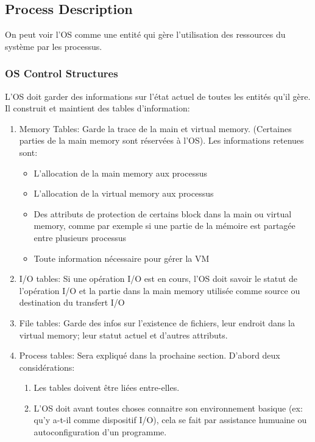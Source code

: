\subsection{Process Description}
On peut voir l'OS comme une entité qui gère l'utilisation des ressources du système par les processus.

\subsubsection{OS Control Structures}
L'OS doit garder des informations sur l'état actuel de toutes les entités qu'il gère.
Il construit et maintient des tables d'information:
\begin{enumerate}
  \item
    Memory Tables: Garde la trace de la main et virtual memory.
    (Certaines parties de la main memory sont réservées à l'OS).
    Les informations retenues sont:
    \begin{itemize}
      \item L'allocation de la main memory aux processus
      \item L'allocation de la virtual memory aux processus
      \item Des attributs de protection de certains block dans la main ou virtual memory, comme par exemple si une partie de la mémoire est partagée entre plusieurs processus
      \item Toute information nécessaire pour gérer la VM
    \end{itemize}
  \item I/O tables: Si une opération I/O est en cours, l'OS doit savoir le statut de l'opération I/O et la partie dans la main memory utilisée comme source ou destination du transfert I/O
  \item File tables: Garde des infos sur l'existence de fichiers, leur endroit dans la virtual memory; leur statut actuel et d'autres attributs.
  \item Process tables: Sera expliqué dans la prochaine section.
    D'abord deux considérations:
    \begin{enumerate}
      \item Les tables doivent être liées entre-elles.
      \item L'OS doit avant toutes choses connaitre son environnement basique (ex: qu'y a-t-il comme dispositif I/O), cela se fait par assistance humuaine ou autoconfiguration d'un programme.
    \end{enumerate}
\end{enumerate}

